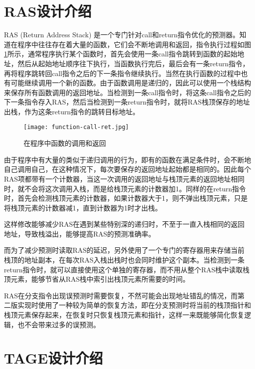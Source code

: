 \section{RAS设计介绍}

RAS (Return Address Stack) 是一个专门针对call和return指令优化的预测器。知道在程序中往往存在着大量的函数，它们会不断地调用和返回，指令执行过程如图\ref{fig:figure22}所示，通常程序执行某个函数时，首先会使用一条call指令跳转到函数的起始地址，然后从起始地址顺序往下执行，当函数执行完后，最后会有一条return指令，再将程序跳转回call指令之后的下一条指令继续执行。当然在执行函数的过程中也有可能继续调用一个新的函数。由于函数调用是递归的，因此可以使用一个栈结构来保存所有函数调用的返回地址。当检测到一条call指令时，将这条call指令之后的下一条指令存入RAS，然后当检测到一条return指令时，就将RAS栈顶保存的地址出栈，作为这条return指令的跳转目标地址。

\begin{figure}[htb]
	\centering
	\setlength\tabcolsep{3pt}  %
	\vspace{5pt} %
	\texttt{[image: function-call-ret.jpg]}
	\caption{在程序中函数的调用和返回}
	\label{fig:figure22}
\end{figure}

由于程序中有大量的类似于递归调用的行为，即有的函数在满足条件时，会不断地自己调用自己，在这种情况下，每次要保存的返回地址起始都是相同的。因此每个RAS项都带有一个计数器，当这一次调用的返回地址与栈顶元素的返回地址相同时，就不会将这次调用入栈，而是给栈顶元素的计数器加1。同样的在return指令时，首先会检测栈顶元素的计数器，如果计数器大于1，则不弹出栈顶元素，只是将栈顶元素的计数器减1，直到计数器为1时才出栈。

这样修改能够减少RAS在遇到某些特别深的递归时，不至于一直入栈相同的返回地址，导致栈溢出，能够提高RAS的预测准确率。

而为了减少预测时读取RAS的延迟，另外使用了一个专门的寄存器用来存储当前栈顶的地址副本，在每次RAS入栈出栈时也会同时维护这个副本。当检测到一条return指令时，就可以直接使用这个单独的寄存器，而不用从整个RAS栈中读取栈顶元素，能够节省从RAS栈中索引出栈顶元素所需要的时间。

RAS在分支指令出现误预测时需要恢复，不然可能会出现地址错乱的情况，而第二版实现时使用了一种较为简单的恢复方法，即在分支预测时将当前的栈顶指针和栈顶元素保存起来，在恢复时只恢复栈顶元素和指针，这样一来既能够简化恢复逻辑，也不会带来过多的误预测。

\section{TAGE设计介绍}

